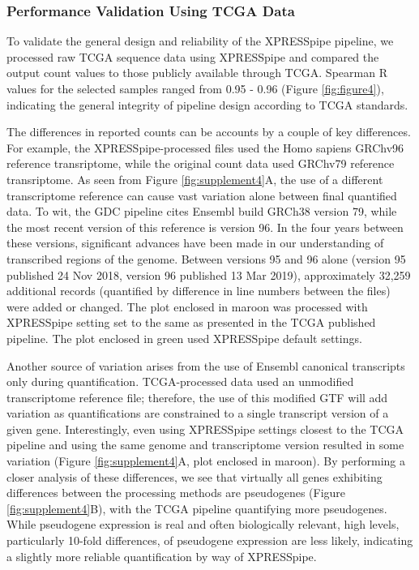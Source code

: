 \documentclass[11pt, a4paper, oneside]{article}
\begin{document}
\subsubsection{Performance Validation Using TCGA Data}
To validate the general design and reliability of the XPRESSpipe pipeline, we processed raw TCGA sequence data using XPRESSpipe and compared the output count values to those publicly available through TCGA. Spearman R values for the selected samples ranged from 0.95 - 0.96 (Figure \ref{fig:figure4}), indicating the general integrity of pipeline design according to TCGA standards. \par

The differences in reported counts can be accounts by a couple of key differences. For example, the XPRESSpipe-processed files used the Homo sapiens GRChv96 reference transriptome, while the original count data used GRChv79 reference transriptome. As seen from Figure \ref{fig:supplement4}A, the use of a different transcriptome reference can cause vast variation alone between final quantified data. To wit, the GDC pipeline cites Ensembl build GRCh38 version 79, while the most recent version of this reference is version 96. In the four years between these versions, significant advances have been made in our understanding of transcribed regions of the genome. Between versions 95 and 96 alone (version 95 published 24 Nov 2018, version 96 published 13 Mar 2019), approximately 32,259 additional records (quantified by difference in line numbers between the files) were added or changed. The plot enclosed in maroon was processed with XPRESSpipe setting set to the same as presented in the TCGA published pipeline. The plot enclosed in green used XPRESSpipe default settings. \par

Another source of variation arises from the use of Ensembl canonical transcripts only during quantification. TCGA-processed data used an unmodified transcriptome reference file; therefore, the use of this modified GTF will add variation as quantifications are constrained to a single transcript version of a given gene. Interestingly, even using XPRESSpipe settings closest to the TCGA pipeline and using the same genome and transcriptome version resulted in some variation (Figure \ref{fig:supplement4}A, plot enclosed in maroon). By performing a closer analysis of these differences, we see that virtually all genes exhibiting differences between the processing methods are pseudogenes (Figure \ref{fig:supplement4}B), with the TCGA pipeline quantifying more pseudogenes. While pseudogene expression is real and often biologically relevant, high levels, particularly 10-fold differences, of pseudogene expression are less likely, indicating a slightly more reliable quantification by way of XPRESSpipe. \par
\end{document}
